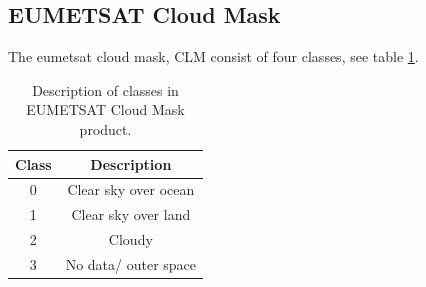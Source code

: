 \subsection{EUMETSAT Cloud Mask} \label{sec:EUMETSAT_cloud_mask}
The \acrshort{eumetsat} cloud mask, CLM consist of four classes, see table \ref{tab:classes_clm}.

\begin{table}[]
    \centering
    \begin{tabular}{c|c}
        Class & Description \\ \hline
        0 & Clear sky over ocean \\
        1 & Clear sky over land \\
        2 & Cloudy \\
        3 & No data/ outer space        
    \end{tabular}
    \caption{Description of classes in EUMETSAT Cloud Mask product.}
    \label{tab:classes_clm}
\end{table}

